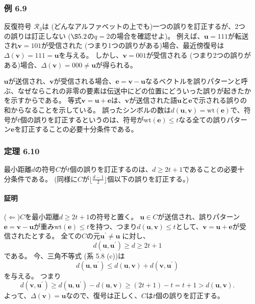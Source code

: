 \documentclass[12pt,a4paper]{article}
\begin{document}
\subsubsection*{例 6.9}

反復符号 $\mathcal{R}_3$は (どんなアルファベットの上でも)一つの誤りを訂正するが、2つの誤りは訂正しない ($\S 5.2$の$q=2$の場合を確認せよ)。
例えば、$\mathbf{u} = 111$が転送され$\mathbf{v} = 101$が受信された (つまり1つの誤りがある)場合、最近傍復号は$\Delta (\mathbf{v}) = 111 = \mathbf{u}$を与える。
しかし、$\mathbf{v} = 001$が受信される (つまり2つの誤りがある)場合、$\Delta (\mathbf{v}) = 000 \neq \mathbf{u}$が得られる。

$\mathbf{u}$が送信され、$\mathbf{v}$が受信される場合、$\mathbf{e} = \mathbf{v} - \mathbf{u}$なるベクトルを誤りパターンと呼ぶ、なぜならこれの非零の要素は伝送中にどの位置にどういった誤りが起きたかを示すからである。
等式$\mathbf{v} = \mathbf{u} + \mathbf{e}$は、$\mathbf{v}$が送信された語$\mathbf{u}$と$\mathbf{e}$で示される誤りの和からなることを示している。
誤ったシンボルの数は$d(\mathbf{u}, \mathbf{v}) = \text{wt} (\mathbf{e})$で、符号が$t$個の誤りを訂正するというのは、符号が$\text{wt} (\mathbf{e}) \leq t$なる全ての誤りパターン$\mathbf{e}$を訂正することの必要十分条件である。

\subsubsection*{定理 6.10}

最小距離$d$の符号$C$が$t$個の誤りを訂正するのは、$d \geq 2t + 1 $であることの必要十分条件である。
(同様に$C$が$\lfloor \frac{d-1}{2} \rfloor$個以下の誤りを訂正する。)

\paragraph{証明}

($\Leftarrow$)$C$を最小距離$d \geq 2t + 1$の符号と置く。
$\mathbf{u} \in C$が送信され、誤りパターン$\mathbf{e} = \mathbf{v} - \mathbf{u}$が重み$\text{wt} (\mathbf{e}) \leq t$を持つ、つまり$d(\mathbf{u}, \mathbf{v}) \leq t$として、$\mathbf{v} = \mathbf{u} + \mathbf{e}$が受信されたとする。
全ての$C$の元$\mathbf{u}^\prime \neq \mathbf{u}$ に対し、
$$
d(\mathbf{u}, \mathbf{u}^\prime) \geq d \geq 2t + 1
$$
である。
今、三角不等式 (系 5.8 (c))は
$$
d(\mathbf{u}, \mathbf{u}^\prime) \leq d(\mathbf{u}, \mathbf{v}) + d(\mathbf{v}, \mathbf{u}^\prime)
$$
を与える。
つまり
$$
d(\mathbf{v}, \mathbf{u}^\prime) \geq d(\mathbf{u}, \mathbf{u}^\prime) - d(\mathbf{u}, \mathbf{v}) \geq (2t + 1) - t = t + 1 > d(\mathbf{u}, \mathbf{v}).
$$
よって、$\Delta (\mathbf{v}) = \mathbf{u}$なので、復号は正しく、$C$は$t$個の誤りを訂正する。
\end{document}

